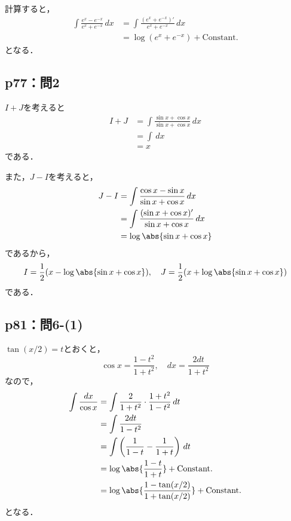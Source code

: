 \documentclass[uplatex,dvipdfmx,a4paper,10pt,fleqn]{jsarticle}
\begin{document}
\begin{tleftbar}
    計算すると，
    \begin{align*} 
        \int \frac{e^x-e^{-x}}{e^x+e^{-x}}  \, dx & = \int \frac{(e^x+e^{-x})'}{e^x+e^{-x}} \, dx \\
        & = \log (e^x + e^{-x})+\mathrm{Constant.}
    \end{align*} 
    となる．
\end{tleftbar}


\subsection*{p77：問2}

\begin{tleftbar}
    $I+J$を考えると
    \begin{align*} 
        I + J & = \int \frac{\sin x+\cos x}{\sin x + \cos x} \, dx \\
        & = \int \, dx \\
        & = x
    \end{align*} 
    である．

    また，$ J-I$を考えると，
    \begin{align*} 
        J - I & = \int \frac{\cos x -\sin x}{\sin x + \cos x} \, dx \\
        & = \int \frac{(\sin x + \cos x)'}{\sin x + \cos x} \, dx \\
        & = \log \abs{\sin x+\cos x}
    \end{align*}
    であるから，
    \[
        I = \frac{1}{2}(x- \log \abs{\sin x + \cos x}),\quad J = \frac{1}{2} ( x + \log \abs{\sin x + \cos x})
    \]
    である．
\end{tleftbar}

\subsection*{p81：問6-(1)}

\begin{tleftbar}
    $ \tan (x/2)=t$とおくと，
    \[
        \cos x = \frac{1-t^2}{1+t^2} ,\quad dx = \frac{2dt}{1+t^2}
    \]
    なので，
    \begin{align*} 
    \int \frac{dx}{\cos x} & = \int \frac{2}{1+t^2} \cdot \frac{1+t^2}{1-t^2} \, dt \\
    & = \int \frac{2dt}{1-t^2} \\
    & = \int \left ( \frac{1}{1-t}-\frac{1}{1+t} \right) \, dt\\
    & = \log \abs{\frac{1-t}{1+t}} + \mathrm{Constant.} \\
    & = \log \abs{\frac{1-\tan (x/2)}{1+\tan (x/2)}}+\mathrm{Constant.} 
    \end{align*}
    となる．
\end{tleftbar}
\end{document}
